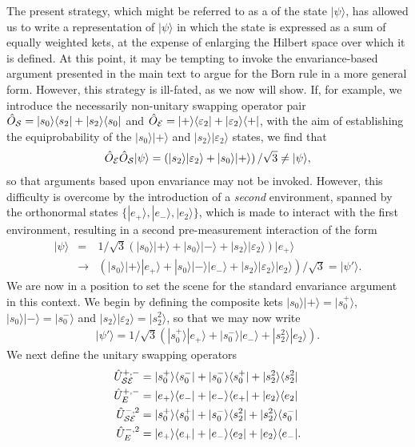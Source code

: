\documentclass[12pt]{iopart}
\begin{document}
The present strategy, which might be referred to as a  of the state $|\psi\rangle$, has allowed us to write a representation of $|\psi\rangle$ in which the state is expressed as a sum of equally weighted kets, at the expense of enlarging the Hilbert space over which it is defined. At this point, it may be tempting to invoke the envariance-based argument presented in the main text to argue for the Born rule in a more general form. However, this strategy is ill-fated, as we now will show. If, for example, we introduce the necessarily non-unitary swapping operator pair $\hat{O}_{\cal S}=|s_0\rangle\langle s_2| + |s_2\rangle\langle s_0|$ and $\hat{O}_{\cal E}=|+\rangle\langle \varepsilon_2| + |\varepsilon_2\rangle\langle +|$, with the aim of establishing the equiprobability of the $|s_0\rangle|+\rangle$ and $|s_2\rangle|\varepsilon_2\rangle$ states, we find that
%
\begin{eqnarray}\label{eq:genpsi}
	\hat{O}_{\cal E}\hat{O}_{\cal S}|\psi\rangle=\left(|s_2\rangle|\varepsilon_2\rangle+|s_0\rangle|+\rangle\right)/\sqrt{3}\neq|\psi\rangle,
\end{eqnarray}
%
so that arguments based upon envariance may not be invoked. However, this difficulty is overcome by the introduction of a \textit{second} environment, spanned by the orthonormal states $\{|e_+\rangle,|e_-\rangle,|e_2\rangle\}$, which is made to interact with the first environment, resulting in a second pre-measurement interaction of the form
%
\begin{eqnarray}\label{eq:genpsi}
	|\psi\rangle&=&1/\sqrt{3}\left(|s_0\rangle|+\rangle+|s_0\rangle|-\rangle+|s_2\rangle|\varepsilon_2\rangle\right)|e_+\rangle \\\nonumber &\rightarrow&\left(|s_0\rangle|+\rangle|e_+\rangle+|s_0\rangle|-\rangle|e_- \rangle+|s_2\rangle|\varepsilon_2 \rangle | e_2\rangle\right)/\sqrt{3}=|\psi'\rangle.
\end{eqnarray}
%
We are now in a position to set the scene for the standard envariance argument in this context. We begin by defining the composite kets $|s_0\rangle|+\rangle=|s_0^+\rangle$, $|s_0\rangle|-\rangle = |s_0^-\rangle$ and $|s_2\rangle|\varepsilon_2\rangle = |s_2^2\rangle$, so that we may now write
%
\begin{eqnarray}\label{eq:genpsi}
	|\psi'\rangle=1/\sqrt{3}\left(|s_0^+\rangle|e_+\rangle+|s_0^-\rangle|e_-\rangle+|s_2^2\rangle|e_2\rangle\right).
\end{eqnarray}
%
We next define the unitary swapping operators
% 
\begin{eqnarray}\label{eq:genpsi}
	\hat{U}^{+,-}_{\cal SE}&= |s_0^+\rangle\langle s_0^-| + |s_0^-\rangle\langle s_0^+| + |s_2^2\rangle \langle s_2^2| \\
	\hat{U}^{+,-}_{E}&= |e_+\rangle \langle e_-| + |e_-\rangle \langle e_+| + |e_2\rangle \langle e_2| \\
	\hat{U}^{-,2}_{\cal SE}&=|s_0^+\rangle \langle s_0^+| + |s_0^-\rangle \langle s_2^2| + |s_2^2\rangle \langle s_0^-|  \\
	\hat{U}^{-,2}_{E}&= |e_+\rangle \langle e_+| + |e_-\rangle \langle e_2| + |e_2\rangle \langle e_-|.
\end{eqnarray}
\end{document}
